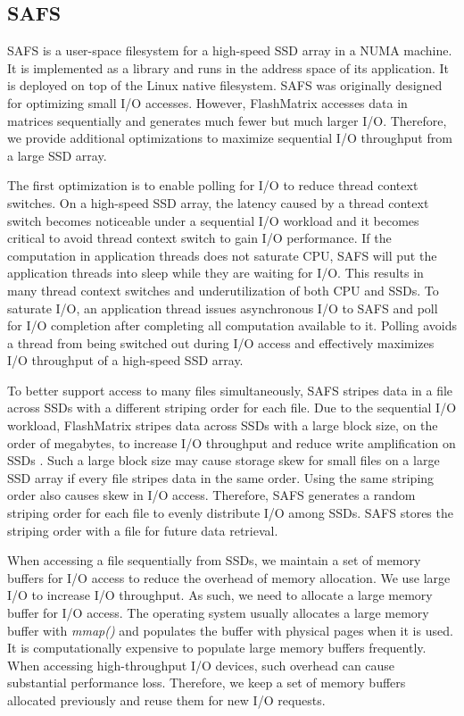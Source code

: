 \subsection{SAFS}

SAFS \cite{safs} is a user-space filesystem for a high-speed SSD array in
a NUMA machine. It is implemented as
a library and runs in the address space of its application. It is deployed
on top of the Linux native filesystem. SAFS was originally designed for
optimizing small I/O accesses. However, FlashMatrix accesses data in matrices
sequentially and
generates much fewer but much larger I/O. Therefore, we provide additional
optimizations to maximize sequential I/O throughput from a large SSD array.

The first optimization is to enable polling for I/O to reduce thread context
switches. On a high-speed SSD array, the latency caused by a thread context
switch becomes noticeable under a sequential I/O workload and it becomes
critical to avoid thread
context switch to gain I/O performance. If the computation in application
threads does not saturate CPU, SAFS will put the application threads into
sleep while they are waiting for I/O. This results in many thread context
switches and underutilization of both CPU and SSDs. To saturate I/O,
an application thread issues asynchronous I/O to SAFS and poll for I/O
completion after completing all computation available to it. Polling avoids
a thread from being switched out during I/O access and effectively maximizes
I/O throughput of a high-speed SSD array.

To better support access to many files simultaneously, SAFS stripes data in
a file across SSDs with a different striping order for each file. Due to
the sequential I/O workload, FlashMatrix stripes data across SSDs with a large
block size, on the order of megabytes, to increase I/O throughput and reduce
write amplification on SSDs \cite{Tang15}. Such a large block size may cause
storage skew for small files on a large SSD array if every file stripes data
in the same order. Using the same striping order also causes skew in I/O access.
Therefore, SAFS generates a random striping order for each file to evenly
distribute I/O among SSDs. SAFS stores the striping order with a file for
future data retrieval.

When accessing a file sequentially from SSDs, we maintain a set of memory buffers
for I/O access to reduce the overhead of memory allocation.
We use large I/O to increase I/O throughput. As such, we need to allocate
a large memory buffer for I/O access.
The operating system usually allocates a large memory buffer with \textit{mmap()}
and populates the buffer with physical pages when it is used. It is
computationally expensive to populate
large memory buffers frequently. When accessing high-throughput I/O devices,
such overhead can cause substantial performance loss. Therefore, we keep a set
of memory buffers allocated previously and reuse them for new I/O requests.

